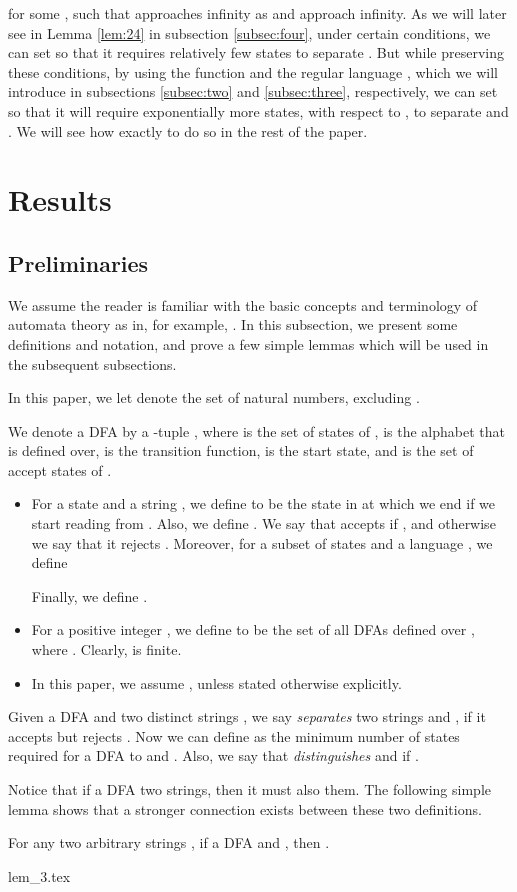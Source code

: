 \documentclass[preprint, 12pt]{elsarticle}
\begin{document}
	for some , such that  approaches infinity as  and  approach infinity. As we will later see in Lemma \ref{lem:24} in subsection \ref{subsec:four}, under certain conditions, we can set  so that it requires relatively few states to separate . But while preserving these conditions, by using the function  and the regular language , which we will introduce in subsections \ref{subsec:two} and \ref{subsec:three}, respectively, we can set  so that it will require exponentially more states, with respect to , to separate  and . We will see how exactly to do so in the rest of the paper.	
\section{Results}	
	\subsection{Preliminaries}
	We assume the reader is familiar with the basic concepts and terminology of automata theory as in, for example, \cite{Hopcroft}. In this subsection, we present some definitions and notation, and prove a few simple lemmas which will be used in the subsequent subsections.
	
	In this paper, we let  denote the set of natural numbers, excluding .
	
	\begin{definition}
	We denote a DFA  by a -tuple , where  is the set of states of ,  is the alphabet that  is defined over,  is the transition function,  is the start state, and  is the set of accept states of .
	\begin{itemize}			
		\item
			For a state  and a string , we define  to be the state in  at which we end if we start reading  from .
			Also, we define . We say that  accepts  if , and otherwise we say that it rejects .  Moreover, for a subset of states  and a language , we define
			
			Finally, we define .
		\item
			For a positive integer , we define  to be the set of all DFAs  defined over , where . Clearly,  is finite.
		\item 	
			In this paper, we assume , unless stated otherwise explicitly.
			
		\end{itemize}		
	\end{definition}
		
	\begin{definition}
		Given a DFA  and two distinct strings , we say   \textit{separates} two strings  and , if it accepts  but rejects . Now we can define  as the minimum number of states required for a DFA to \separate  and .
		Also, we say that  \textit{distinguishes}  and  if .
	\end{definition}
	Notice that if a DFA \separates two strings, then it must also \distinguish them. The following simple lemma shows that a stronger connection exists between these two definitions.
	\begin{lemma}
		\label{lem:3}
		For any two arbitrary strings , if a DFA  \distinguishes  and , then .
	\end{lemma}
	{lem_3.tex}
\end{document}
